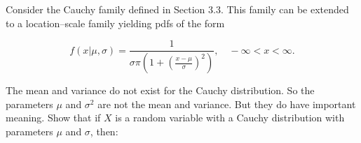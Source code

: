 \documentclass[12pt,letterpaper]{exam}
\begin{document}
\begin{questions}
	\question 
	Consider the Cauchy family defined in Section 3.3. This family can be extended to a
	location–scale family yielding pdfs of the form
	
	\[f(x|\mu,\sigma) = \frac{1}{\sigma\pi \left(1 + \left(\frac{x-\mu}{\sigma}\right)^2 \right)} ,\quad -\infty<x<\infty.\]
	
	The mean and variance do not exist for the Cauchy distribution. So the parameters
	\(\mu\) and \(\sigma^2\) are not the mean and variance. But they do have important meaning. Show
	that if \(X\) is a random variable with a Cauchy distribution with parameters \(\mu\) and \(\sigma\),
	then:
	
	
	\begin{solution}
		\begin{parts}

\end{parts}
\end{solution}
\end{questions}
\end{document}

